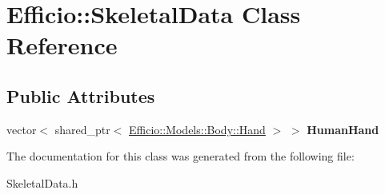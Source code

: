 \hypertarget{class_efficio_1_1_skeletal_data}{}\section{Efficio\+:\+:Skeletal\+Data Class Reference}
\label{class_efficio_1_1_skeletal_data}
\subsection*{Public Attributes}
\begin{DoxyCompactItemize}
\item 
vector$<$ shared\+\_\+ptr$<$ \hyperlink{class_efficio_1_1_models_1_1_body_1_1_hand}{Efficio\+::\+Models\+::\+Body\+::\+Hand} $>$ $>$ {\bfseries Human\+Hand}\hypertarget{class_efficio_1_1_skeletal_data_a634847b9c511819aca2054b551cd2082}{}\label{class_efficio_1_1_skeletal_data_a634847b9c511819aca2054b551cd2082}

\end{DoxyCompactItemize}


The documentation for this class was generated from the following file\+:\begin{DoxyCompactItemize}
\item 
Skeletal\+Data.\+h\end{DoxyCompactItemize}
